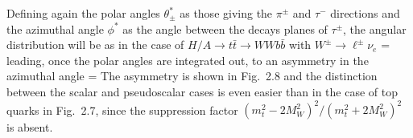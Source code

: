 Defining again the polar angles $\theta_\pm^*$ as those giving the $\pi^\pm$
and $\tau^-$ directions and the azimuthal angle $\phi^*$ as the angle between
the decays planes of $\tau^\pm$, the angular distribution will be as in the
case of $H/A \to t\bar{t} \to WW b\bar{b}$ with $W^\pm \to \ell^\pm \nu_e$ 
\cite{CPHff1}
\beq
{} = 
\label{Htauangular}
\eeq
leading, once the polar angles are integrated out, to an asymmetry in the 
azimuthal angle 
\beq
{} =  
\eeq
The asymmetry is shown in Fig.~2.8 and the distinction between the scalar and
pseudoscalar cases is even easier than in the case of top quarks in Fig.~2.7, 
since the suppression factor $(m_t^2-2M_W^2)^2/(m_t^2+2M_W^2)^2$ is absent. \s

\begin{figure}[!h]
\begin{center}
\vspace*{-2.4cm}
\hspace*{-3cm}
\end{center}
\vspace*{-12.3cm}
\end{figure}

